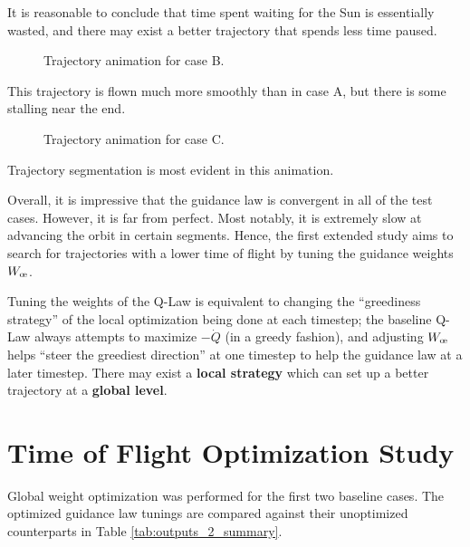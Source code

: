It is reasonable to conclude that time spent waiting for the Sun is essentially wasted, and there may exist a better trajectory that spends less time paused.
\begin{figure}[H]
    \caption{Trajectory animation for case B.}
    \label{fig:anim_b}
\end{figure}

This trajectory is flown much more smoothly than in case A, but there is some stalling near the end.

\begin{figure}[H]
    \caption{Trajectory animation for case C.}
    \label{fig:anim_c}
\end{figure}
Trajectory segmentation is most evident in this animation.

Overall, it is impressive that the guidance law is convergent in all of the test cases. However, it is far from perfect. Most notably, it is extremely slow at advancing the orbit in certain segments. Hence, the first extended study aims to search for trajectories with a lower time of flight by tuning the guidance weights \(W_{\moe}\).

Tuning the weights of the Q-Law is equivalent to changing the ``greediness strategy'' of the local optimization being done at each timestep; the baseline Q-Law always attempts to maximize \(-\dot{Q}\) (in a greedy fashion), and adjusting \(W_{\moe}\) helps ``steer the greediest direction'' at one timestep to help the guidance law at a later timestep. There may exist a \textbf{local strategy} which can set up a better trajectory at a \textbf{global level}.


\newpage
\section{Time of Flight Optimization Study}
Global weight optimization was performed for the first two baseline cases. The optimized guidance law tunings are compared against their unoptimized counterparts in Table \ref{tab:outputs_2_summary}.

